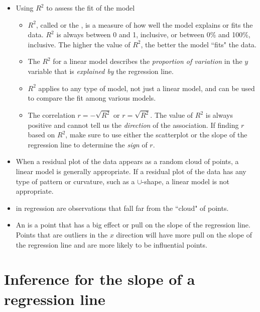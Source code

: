 \begin{itemize}
\item Using $R^2$ to assess the fit of the model
\begin{itemize}
\item $R^2$, called  or the , is a measure of how well the model explains or fits the data. $R^2$ is always between 0 and 1, inclusive, or between 0\% and 100\%, inclusive.  The higher the value of $R^2$, the better the model ``fits" the data. 
\item The $R^2$ for a linear model describes the \emph{proportion of variation} in the $y$ variable that is \emph{explained by} the regression line.
\item $R^2$ applies to any type of model, not just a linear model, and can be used to compare the fit among various models.
\item The correlation $r = - \sqrt{R^2}$ or $r = \sqrt{R^2}$. The value of $R^2$ is always positive and cannot tell us the \emph{direction} of the association.  If finding $r$ based on $R^2$, make sure to use either the scatterplot or the slope of the regression line to determine the \emph{sign} of $r$.
\end{itemize}

\item When a residual plot of the data appears as a random cloud of points, a linear model is generally appropriate. If a residual plot of the data has any type of pattern or curvature, such as a $\cup$-shape, a linear model is not appropriate.

\item {} in regression are observations that fall far from the ``cloud" of points.

\item An  is a point that has a big effect or pull on the slope of the regression line.  Points that are outliers in the $x$ direction will have more pull on the slope of the regression line and are more likely to be influential points.

\end{itemize}




{}






\section[Inference for the slope of a regression line]{Inference for the slope of a regression line }
\label{inferenceForLinearRegression}

